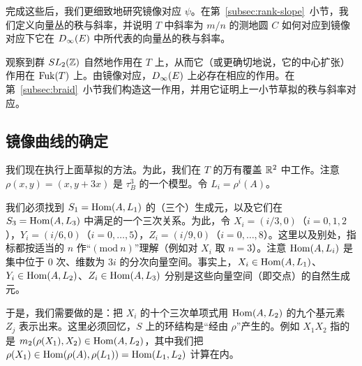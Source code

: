 完成这些后，我们更细致地研究镜像对应 $\psi$。在第~\ref{subsec:rank-slope}~小节，我们定义向量丛的秩与斜率，并说明 $T$ 中斜率为 $m/n$ 的测地圆 $C$ 如何对应到镜像对应下它在 $D_\infty(E)$ 中所代表的向量丛的秩与斜率。

观察到群 $SL_2(\mathbb{Z})$ 自然地作用在 $T$ 上，从而它（或更确切地说，它的中心扩张）作用在 $\operatorname{Fuk}(T)$ 上。由镜像对应，$D_\infty(E)$ 上必存在相应的作用。在第~\ref{subsec:braid}~小节我们构造这一作用，并用它证明上一小节草拟的秩与斜率对应。

\subsection{镜像曲线的确定}
\label{subsec:determination}

我们现在执行上面草拟的方法。为此，我们在 $T$ 的万有覆盖 $\mathbb{R}^2$ 中工作。注意 $\rho(x,y)=(x,y+3x)$ 是 $\tau_B^3$ 的一个模型。令 $L_i=\rho^i(A)$。


我们必须找到 $S_1=\operatorname{Hom}(A,L_1)$ 的（三个）生成元，以及它们在 $S_3=\operatorname{Hom}(A,L_3)$ 中满足的一个三次关系。为此，令 $X_i=(i/3,0)$（$i=0,1,2$），$Y_i=(i/6,0)$（$i=0,\ldots,5$），$Z_i=(i/9,0)$（$i=0,\ldots,8$）。这里以及别处，指标都按适当的 $n$ 作“$(\mathrm{mod}\ n)$”理解（例如对 $X_i$ 取 $n=3$）。注意 $\operatorname{Hom}(A,L_i)$ 是集中位于 $0$ 次、维数为 $3i$ 的分次向量空间。事实上，$X_i\in\operatorname{Hom}(A,L_1)$、$Y_i\in\operatorname{Hom}(A,L_2)$、$Z_i\in\operatorname{Hom}(A,L_3)$ 分别是这些向量空间（即交点）的自然生成元。


于是，我们需要做的是：把 $X_i$ 的十个三次单项式用 $\operatorname{Hom}(A,L_2)$ 的九个基元素 $Z_j$ 表示出来。这里必须回忆，$S$ 上的环结构是“经由 $\rho$”产生的。例如 $X_1X_2$ 指的是 $m_2(\rho(X_1),X_2)\in\operatorname{Hom}(A,L_2)$，其中我们把 $\rho(X_1)\in\operatorname{Hom}(\rho(A),\rho(L_1))=\operatorname{Hom}(L_1,L_2)$ 计算在内。

